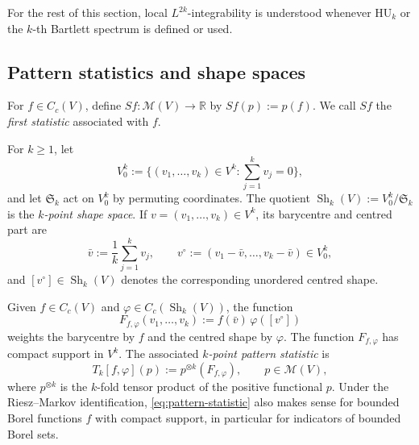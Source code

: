\documentclass[11pt,reqno,a4paper]{amsart}
\numberwithin{equation}{section}
\theoremstyle{compact}
\theoremstyle{definition}
\theoremstyle{definition}
\newcommand{\HU}{\mathrm{HU}}
\newcommand{\cM}{\mathcal M}
\newcommand{\Sh}{\operatorname{Sh}}
\begin{document}
For the rest of this section, local $L^{2k}$-integrability is understood
whenever $\HU_k$ or the $k$-th Bartlett spectrum is defined or used.

\subsection{Pattern statistics and shape spaces}
\label{subsec:pattern-statistics}

For $f\in C_c(V)$, define $Sf:\cM(V)\to\mathbb R$ by $Sf(p):=p(f)$.
We call $Sf$ the \emph{first statistic} associated with $f$.

For $k\geq 1$, let
\begin{equation}\label{eq:centered-tuples}
  V_0^k:=\Big\{(v_1,\ldots,v_k)\in V^k:
  \sum_{j=1}^k v_j=0\Big\},
\end{equation}
and let $\mathfrak S_k$ act on $V_0^k$ by permuting coordinates.  The
quotient $\Sh_k(V):=V_0^k/\mathfrak S_k$ is the \emph{$k$-point shape
space}.  If
$v=(v_1,\ldots,v_k)\in V^k$, its barycentre and centred part are
\begin{equation}\label{eq:barycenter-centered-part}
  \bar v:=\frac1k\sum_{j=1}^k v_j,
  \qquad
  v^\circ:=(v_1-\bar v,\ldots,v_k-\bar v)\in V_0^k,
\end{equation}
and $[v^\circ]\in\Sh_k(V)$ denotes the corresponding unordered centred
shape.

Given $f\in C_c(V)$ and $\varphi\in C_c(\Sh_k(V))$, the function
\begin{equation}\label{eq:pattern-kernel}
  F_{f,\varphi}(v_1,\ldots,v_k)
  :=f(\bar v)\,\varphi([v^\circ])
\end{equation}
weights the barycentre by $f$ and the centred shape by $\varphi$.
The function $F_{f,\varphi}$ has compact support in $V^k$.  The associated
\emph{$k$-point pattern statistic} is
\begin{equation}\label{eq:pattern-statistic}
  T_k[f,\varphi](p):=p^{\otimes k}(F_{f,\varphi}),
  \qquad p\in\cM(V),
\end{equation}
where $p^{\otimes k}$ is the $k$-fold tensor product of the positive
functional $p$.  Under the Riesz--Markov identification,
\eqref{eq:pattern-statistic} also makes sense for bounded Borel functions
$f$ with compact support, in particular for indicators of bounded Borel
sets.
\end{document}
